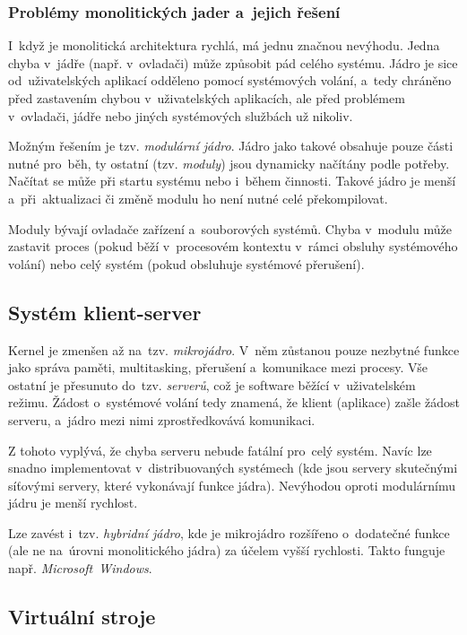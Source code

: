 \subsubsection{Problémy monolitických jader a~jejich řešení}

I~když je monolitická architektura rychlá, má jednu značnou nevýhodu. Jedna chyba v~jádře (např. v~ovladači) může způsobit pád celého systému. Jádro je sice od~uživatelských aplikací odděleno pomocí systémových volání, a~tedy chráněno před zastavením chybou v~uživatelských aplikacích, ale před problémem v~ovladači, jádře nebo jiných systémových službách už nikoliv.

Možným řešením je tzv. \emph{modulární jádro}. Jádro jako takové obsahuje pouze části nutné pro~běh, ty ostatní (tzv. \emph{moduly}) jsou dynamicky načítány podle potřeby. Načítat se může při startu systému nebo i~během činnosti. Takové jádro je menší a~při~aktualizaci či změně modulu ho není nutné celé překompilovat.

Moduly bývají ovladače zařízení a~souborových systémů. Chyba v~modulu může zastavit proces (pokud běží v~procesovém kontextu v~rámci obsluhy systémového volání) nebo celý systém (pokud obsluhuje systémové přerušení).

\subsection{Systém klient-server}

Kernel je zmenšen až na~tzv. \emph{mikrojádro}. V~něm zůstanou pouze nezbytné funkce jako správa paměti, multitasking, přerušení a~komunikace mezi procesy. Vše ostatní je přesunuto do~tzv. \emph{serverů}, což je software běžící v~uživatelském režimu. Žádost o~systémové volání tedy znamená, že klient (aplikace) zašle žádost serveru, a~jádro mezi nimi zprostředkovává komunikaci.

Z tohoto vyplývá, že chyba serveru nebude fatální pro~celý systém. Navíc lze snadno implementovat v~distribuovaných systémech (kde jsou servery skutečnými síťovými servery, které vykonávají funkce jádra). Nevýhodou oproti modulárnímu jádru je menší rychlost.

\vspace{0,5cm}
Lze zavést i~tzv. \emph{hybridní jádro}, kde je mikrojádro rozšířeno o~dodatečné funkce (ale ne na~úrovni monolitického jádra) za účelem vyšší rychlosti. Takto funguje např. \emph{Microsoft~Windows}.

\subsection{Virtuální stroje}

